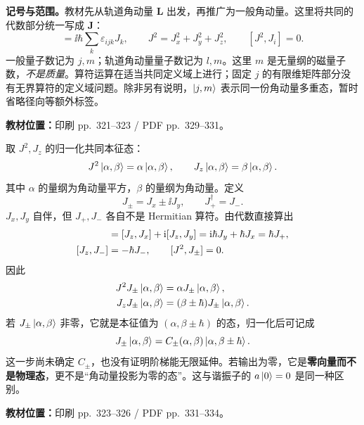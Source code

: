 \textbf{记号与范围。}教材先从轨道角动量 $\mathbf L$ 出发，再推广为一般角动量。这里将共同的代数部分统一写成 $\mathbf J$：
\begin{equation}
  [J_i,J_j]=\ii\hbar\sum_k\varepsilon_{ijk}J_k,
  \qquad J^2=J_x^2+J_y^2+J_z^2,
  \qquad [J^2,J_i]=0.
\end{equation}
一般量子数记为 $j,m$；轨道角动量量子数记为 $l,m$。这里 $m$ 是无量纲的磁量子数，\emph{不是质量}。算符运算在适当共同定义域上进行；固定 $j$ 的有限维矩阵部分没有无界算符的定义域问题。除非另有说明，$\left|j,m\right\rangle$ 表示同一份角动量多重态，暂时省略径向等额外标签。

\textbf{教材位置：}印刷 pp.~321--323 / PDF pp.~329--331。

取 $J^2,J_z$ 的归一化共同本征态：
\begin{equation}
  J^2\left|\alpha,\beta\right\rangle=\alpha\left|\alpha,\beta\right\rangle,
  \qquad J_z\left|\alpha,\beta\right\rangle=\beta\left|\alpha,\beta\right\rangle.
\end{equation}
其中 $\alpha$ 的量纲为角动量平方，$\beta$ 的量纲为角动量。定义
\begin{equation}
  \boxed{J_\pm=J_x\pm\ii J_y},\qquad J_+^\dagger=J_-.
\end{equation}
$J_x,J_y$ 自伴，但 $J_+,J_-$ 各自不是 Hermitian 算符。由代数直接算出
\begin{align}
  [J_z,J_+]&=[J_z,J_x]+\ii[J_z,J_y]
    =\ii\hbar J_y+\hbar J_x=\hbar J_+,\notag\\
  [J_z,J_-]&=-\hbar J_-,\qquad [J^2,J_\pm]=0.
\end{align}
因此
\begin{align}
  J^2J_\pm\left|\alpha,\beta\right\rangle
    &=\alpha J_\pm\left|\alpha,\beta\right\rangle,\notag\\
  J_zJ_\pm\left|\alpha,\beta\right\rangle
    &=(\beta\pm\hbar)J_\pm\left|\alpha,\beta\right\rangle.
\end{align}
若 $J_\pm\left|\alpha,\beta\right\rangle$ 非零，它就是本征值为 $(\alpha,\beta\pm\hbar)$ 的态，归一化后可记成
\begin{equation}
  J_\pm\left|\alpha,\beta\right\rangle
    =C_\pm(\alpha,\beta)\left|\alpha,\beta\pm\hbar\right\rangle.
\end{equation}
这一步尚未确定 $C_\pm$，也没有证明阶梯能无限延伸。若输出为零，它是\textbf{零向量而不是物理态}，更不是“角动量投影为零的态”。这与谐振子的 $a\left|0\right\rangle=0$ 是同一种区别。

\textbf{教材位置：}印刷 pp.~323--326 / PDF pp.~331--334。

